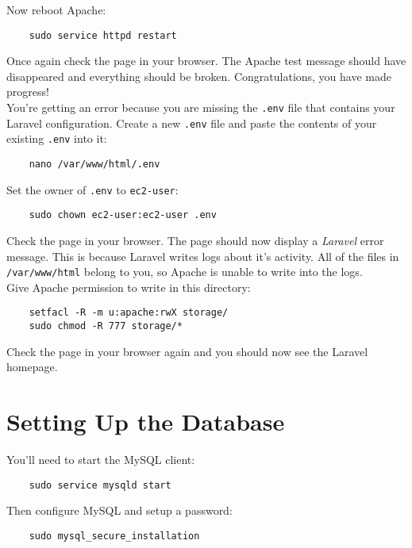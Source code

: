Now reboot Apache:

\begin{verbatim}
    sudo service httpd restart
\end{verbatim}

Once again check the page in your browser. The Apache test message should have disappeared and everything should be broken. Congratulations, you have made progress!
\\

You're getting an error because you are missing the \texttt{.env} file that contains your Laravel configuration. Create a new \texttt{.env} file and paste the contents of your existing \texttt{.env} into it:

\begin{verbatim}
    nano /var/www/html/.env
\end{verbatim}

Set the owner of \texttt{.env} to \texttt{ec2-user}:

\begin{verbatim}
    sudo chown ec2-user:ec2-user .env
\end{verbatim}


Check the page in your browser. The page should now display a \textit{Laravel} error message. This is because Laravel writes logs about it's activity. All of the files in \texttt{/var/www/html} belong to you, so Apache is unable to write into the logs.
\\

Give Apache permission to write in this directory:

\begin{verbatim}
    setfacl -R -m u:apache:rwX storage/
    sudo chmod -R 777 storage/*
\end{verbatim}

Check the page in your browser again and you should now see the Laravel homepage.


\section{Setting Up the Database}

You'll need to start the MySQL client:

\begin{verbatim}
    sudo service mysqld start
\end{verbatim}

Then configure MySQL and setup a password:

\begin{verbatim}
    sudo mysql_secure_installation
\end{verbatim}

